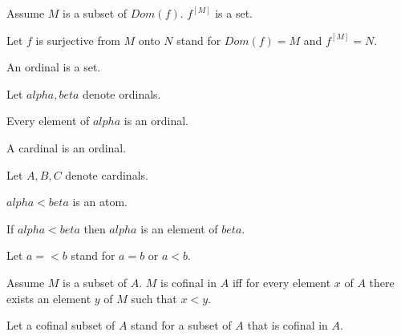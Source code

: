 \documentclass{article}
\begin{document}
\begin{forthel}
    \begin{axiom}
      Assume $M$ is a subset of $Dom(f)$. $f^[M]$ is a set.
    \end{axiom}

    Let $f$ is surjective from $M$ onto $N$ stand for $Dom(f) = M$ and $f^[M] = N$.

    \begin{signature}
      An ordinal is a set.
    \end{signature}

    Let $alpha, beta$ denote ordinals.

    \begin{axiom}
      Every element of $alpha$ is an ordinal.
    \end{axiom}

    \begin{signature}
      A cardinal is an ordinal.
    \end{signature}

    Let $A,B,C$ denote cardinals.

    \begin{signature}
      $alpha < beta$ is an atom.
    \end{signature}

    \begin{axiom}
      If $alpha < beta$ then $alpha$ is an element of $beta$.
    \end{axiom}

    Let $a =< b$ stand for $a = b$ or $a < b$.

    \begin{definition}
      Assume $M$ is a subset of $A$. $M$ is cofinal in $A$ iff for every element $x$ of $A$ there exists an element $y$ of $M$ such that $x < y$.
    \end{definition}

    Let a cofinal subset of $A$ stand for a subset of $A$ that is cofinal in $A$.

\end{forthel}
\end{document}
